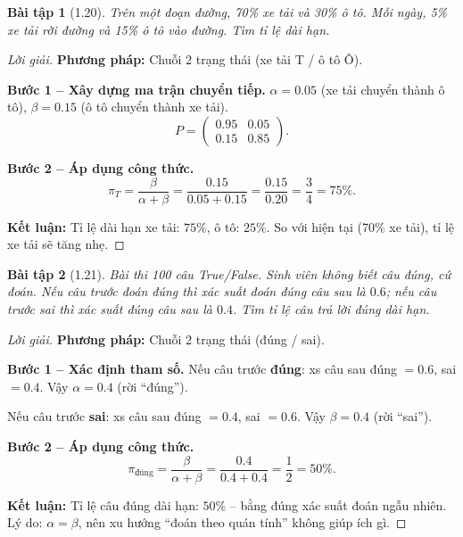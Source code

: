 \documentclass[8pt,a4paper]{article}
\newtheorem{exercise}{Bài tập}
\newenvironment{solution}{\begin{proof}[Lời giải]}{\end{proof}}
\begin{document}
\begin{exercise}[1.20]
Trên một đoạn đường, 70\% xe tải và 30\% ô tô. Mỗi ngày, 5\% xe tải rời đường và 15\% ô tô vào đường. Tìm tỉ lệ dài hạn.
\end{exercise}
\begin{solution}
\textbf{Phương pháp:} Chuỗi 2 trạng thái (xe tải T / ô tô Ô).

\textbf{Bước 1 -- Xây dựng ma trận chuyển tiếp.}
$\alpha = 0.05$ (xe tải chuyển thành ô tô), $\beta = 0.15$ (ô tô chuyển thành xe tải).
\[
  P = \begin{pmatrix} 0.95 & 0.05 \\ 0.15 & 0.85 \end{pmatrix}.
\]

\textbf{Bước 2 -- Áp dụng công thức.}
\[
  \pi_T = \frac{\beta}{\alpha+\beta} = \frac{0.15}{0.05+0.15} = \frac{0.15}{0.20} = \frac{3}{4} = 75\%.
\]

\textbf{Kết luận:} Tỉ lệ dài hạn xe tải: $75\%$, ô tô: $25\%$. So với hiện tại (70\% xe tải), tỉ lệ xe tải sẽ tăng nhẹ.
\end{solution}

\begin{exercise}[1.21]
Bài thi 100 câu True/False. Sinh viên không biết câu đúng, cứ đoán. Nếu câu trước đoán đúng thì xác suất đoán đúng câu sau là $0.6$; nếu câu trước sai thì xác suất đúng câu sau là $0.4$. Tìm tỉ lệ câu trả lời đúng dài hạn.
\end{exercise}
\begin{solution}
\textbf{Phương pháp:} Chuỗi 2 trạng thái (đúng / sai).

\textbf{Bước 1 -- Xác định tham số.}
Nếu câu trước \textbf{đúng}: xs câu sau đúng $= 0.6$, sai $= 0.4$. Vậy $\alpha = 0.4$ (rời ``đúng'').

Nếu câu trước \textbf{sai}: xs câu sau đúng $= 0.4$, sai $= 0.6$. Vậy $\beta = 0.4$ (rời ``sai'').

\textbf{Bước 2 -- Áp dụng công thức.}
\[
  \pi_{\text{đúng}} = \frac{\beta}{\alpha+\beta} = \frac{0.4}{0.4+0.4} = \frac{1}{2} = 50\%.
\]

\textbf{Kết luận:} Tỉ lệ câu đúng dài hạn: $50\%$ -- bằng đúng xác suất đoán ngẫu nhiên. Lý do: $\alpha = \beta$, nên xu hướng ``đoán theo quán tính'' không giúp ích gì.
\end{solution}
\end{document}
